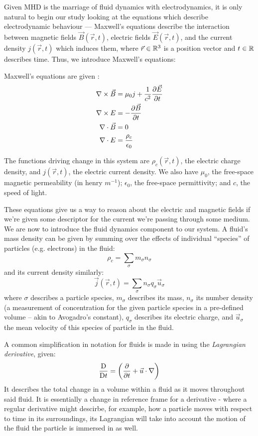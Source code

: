 Given MHD is the marriage of fluid dynamics with electrodynamics, it is only natural to begin our 
study looking at the equations which describe electrodynamic behaviour --- Maxwell's equations 
describe the interaction between magnetic fields $\vec{B}(\vec{r}, t)$, electric fields $\vec{E}(\vec{r}, t)$, and 
the current density $j(\vec{r}, t)$ which induces them, where $\vec{r} \in \mathbb{R}^3$ is a position vector and $t \in \mathbb{R}$ describes time. Thus, we introduce Maxwell's equations:
\begin{definition}
    Maxwell's equations are given \cite{wesson-tokamaks}:
    \begin{align}
        \nabla \times \vec{B} &= \mu_0 j + \frac{1}{c^2} \pdv{\vec{E}}{t} \\
        \nabla \times E &= -\pdv{\vec{B}}{t} \\
        \nabla \cdot \vec{B} &= 0 \\
        \nabla \cdot E &= \frac{\rho_c}{\epsilon_0}
    \end{align}

    The functions driving change in this system are $\rho_c(\vec{r}, t)$, the electric charge density, and $j(\vec{r}, t)$, 
    the electric current density. We also have $\mu_0$, the free-space magnetic permeability (in henry $m^{-1}$); $\epsilon_0$, 
    the free-space permittivity; and $c$, the speed of light.
    
\end{definition}

These equations give us a way to reason about the electric and magnetic fields if we're given some descriptor for the 
current we're passing through some medium. We are now to introduce the fluid dynamics component to our system. A fluid's 
mass density can be given by summing over the effects of individual ``species'' of particles (e.g. electrons) in the fluid:
$$\rho_c = \sum_{\sigma} m_{\sigma} n_{\sigma}$$
and its current density similarly:
$$\vec{j}(\vec{r}, t) = \sum_{\sigma} n_{\sigma} q_{\sigma} \vec{u}_{\sigma}$$
where $\sigma$ describes a particle species, $m_\sigma$ describes its mass, $n_\sigma$ its number density 
(a measurement of concentration for the given particle species in a pre-defined volume -- akin to Avogadro's constant), 
$q_\sigma$ describes its electric charge, and $\vec{u}_\sigma$ the mean velocity of this species of particle in the fluid. 


\begin{notn}
    A common simplification in notation for fluids is made in using the \emph{Lagrangian derivative}, given:
    $$\frac{\text{D}}{\text{D} t} = \left (\pdv{t} + \vec{u} \cdot \nabla \right )$$ 
    It describes the total change in a volume within a fluid as it moves throughout said fluid. It is essentially 
    a change in reference frame for a derivative - where a regular derivative might descirbe, for example, 
    how a particle moves with respect to time in its surroundings, its Lagrangian will take into account 
    the motion of the fluid the particle is immersed in as well.
\end{notn}

